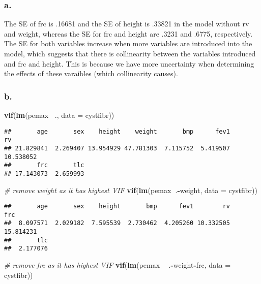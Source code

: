 \documentclass[]{article}
\newenvironment{Shaded}{\begin{snugshade}}{\end{snugshade}}
\newcommand{\CommentTok}[1]{\textcolor[rgb]{0.56,0.35,0.01}{\textit{#1}}}
\newcommand{\DataTypeTok}[1]{\textcolor[rgb]{0.13,0.29,0.53}{#1}}
\newcommand{\KeywordTok}[1]{\textcolor[rgb]{0.13,0.29,0.53}{\textbf{#1}}}
\newcommand{\NormalTok}[1]{#1}
\newcommand{\OperatorTok}[1]{\textcolor[rgb]{0.81,0.36,0.00}{\textbf{#1}}}
\newcommand{\StringTok}[1]{\textcolor[rgb]{0.31,0.60,0.02}{#1}}
\begin{document}
\hypertarget{a.}{%
\subsubsection{a.}\label{a.}}

The SE of frc is .16681 and the SE of height is .33821 in the model
without rv and weight, whereas the SE for frc and height are .3231 and
.6775, respectively. The SE for both variables increase when more
variables are introduced into the model, which suggests that there is
collinearity between the variables introduced and frc and height. This
is because we have more uncertainty when determining the effects of
these varaibles (which collinearity causes).

\hypertarget{b.}{%
\subsubsection{b.}\label{b.}}

\begin{Shaded}
\begin{Highlighting}[]
\KeywordTok{vif}\NormalTok{(}\KeywordTok{lm}\NormalTok{(pemax }\OperatorTok{~}\NormalTok{., }\DataTypeTok{data =}\NormalTok{ cystfibr))}
\end{Highlighting}
\end{Shaded}

\begin{verbatim}
##       age       sex    height    weight       bmp      fev1        rv 
## 21.829841  2.269407 13.954929 47.781303  7.115752  5.419507 10.538052 
##       frc       tlc 
## 17.143073  2.659993
\end{verbatim}

\begin{Shaded}
\begin{Highlighting}[]
\CommentTok{# remove weight as it has highest VIF}
\KeywordTok{vif}\NormalTok{(}\KeywordTok{lm}\NormalTok{(pemax}\OperatorTok{~}\NormalTok{.}\OperatorTok{-}\NormalTok{weight, }\DataTypeTok{data =}\NormalTok{  cystfibr))}
\end{Highlighting}
\end{Shaded}

\begin{verbatim}
##       age       sex    height       bmp      fev1        rv       frc 
##  8.097571  2.029182  7.595539  2.730462  4.205260 10.332505 15.814231 
##       tlc 
##  2.177076
\end{verbatim}

\begin{Shaded}
\begin{Highlighting}[]
\CommentTok{# remove frc as it has highest VIF}
\KeywordTok{vif}\NormalTok{(}\KeywordTok{lm}\NormalTok{(pemax }\OperatorTok{~}\StringTok{ }\NormalTok{.}\OperatorTok{-}\NormalTok{weight}\OperatorTok{-}\NormalTok{frc, }\DataTypeTok{data =}\NormalTok{ cystfibr))}
\end{Highlighting}
\end{Shaded}
\end{document}
